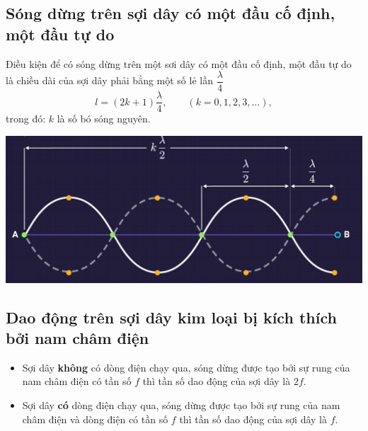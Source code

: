 \subsection{Sóng dừng trên sợi dây có một đầu cố định, một đầu tự do}
Điều kiện để có sóng dừng trên một sơi dây có một đầu cố định, một đầu tự do là chiều dài của sợi dây phải bằng một số lẻ lần $\dfrac{\lambda}{4}$
\begin{equation*}
	l=(2k+1)\dfrac{\lambda}{4},\qquad(k=0,1,2,3,\ldots),
\end{equation*}
trong đó: $k$ là số bó sóng nguyên.
\begin{center}
	\includegraphics[scale=0.4]{../figs/VN12-PH-12-A-008-1-V2-3.png}
\end{center}
\subsection{Dao động trên sợi dây kim loại bị kích thích bởi nam châm điện}
\begin{itemize}
	\item Sợi dây \textbf{không} có dòng điện chạy qua, sóng dừng được tạo bởi sự rung của nam châm điện có tần số $f$ thì tần số dao động của sợi dây là $2f$.
	\item Sợi dây \textbf{có} dòng điện chạy qua, sóng dừng được tạo bởi sự rung của nam châm điện và dòng điện có tần số $f$ thì tần số dao động của sợi dây là $f$.
\end{itemize}
